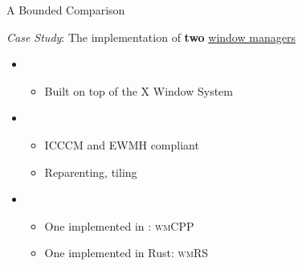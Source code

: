\begin{secframe}{A Bounded Comparison}

    \textit{Case Study}: The implementation of \textbf{two} \underline{window managers}

    \begin{itemize}
        \item {}
            \begin{itemize}
                \item Built on top of the X Window System
            \end{itemize}
        \item {}
            \begin{itemize}
                \item ICCCM and EWMH compliant
                \item Reparenting, tiling
            \end{itemize}
        \item {}
            \begin{itemize}
                \item One implemented in \cpp: \textsc{wmCPP}
                \item One implemented in Rust: \textsc{wmRS}
            \end{itemize}
    \end{itemize}

    \vfill

\end{secframe}
